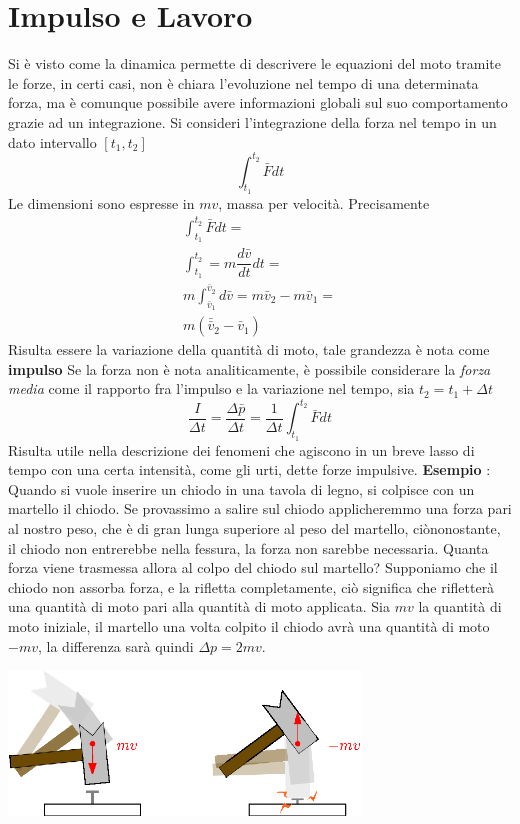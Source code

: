 \documentclass[10pt, letterpaper]{report}
\begin{document}
\section{Impulso e Lavoro}
Si è visto come la dinamica permette di descrivere le equazioni 
del moto tramite le forze, in certi casi, non è chiara l'evoluzione 
nel tempo di una determinata forza, ma è comunque possibile 
avere informazioni globali sul suo comportamento grazie ad un
 integrazione. Si consideri l'integrazione della forza nel tempo in un dato 
 intervallo $[t_1,t_2]$
 $$ \int_{t_1}^{t_2}\bar F dt$$
 Le dimensioni sono espresse in $mv$, massa per velocità. Precisamente 
\begin{eqnarray}
    \int_{t_1}^{t_2}\bar Fdt =\\ 
    \int_{t_1}^{t_2} = m\dfrac{d\bar v}{dt}dt =\\ 
    m\int_{ \bar v_1}^{ \bar v_2}d\bar v = m\bar v_2-m\bar v_1=\\
    m(\bar \bar v_2-\bar v_1)
\end{eqnarray}
Risulta essere la variazione della quantità di moto, tale grandezza 
è nota come \textbf{impulso}
Se la forza non è nota analiticamente, è possibile 
considerare la \textit{forza media} come il rapporto fra l'impulso 
e la variazione nel tempo, sia $t_2=t_1+\Delta t$
$$ \frac{I}{\Delta t}=\frac{\Delta \bar p}{\Delta t}
=\frac{1}{\Delta t}\int_{t_1}^{t_2}\bar F dt$$
Risulta utile nella descrizione dei fenomeni che agiscono in 
un breve lasso di tempo con una certa intensità, come gli urti, dette 
forze impulsive.\acc 
\textbf{Esempio} : Quando si vuole inserire un chiodo in una tavola di legno, si colpisce 
con un martello il chiodo. Se provassimo a salire sul chiodo applicheremmo una forza pari al nostro peso, che è 
di gran lunga superiore al peso del martello, ciònonostante, il chiodo non entrerebbe nella fessura, la forza non sarebbe 
necessaria.\acc 
Quanta forza viene trasmessa allora al colpo del chiodo sul martello? Supponiamo che il chiodo non assorba 
forza, e la rifletta completamente, ciò significa che rifletterà una quantità di moto pari alla quantità 
di moto applicata. Sia $mv$ la quantità di moto iniziale, il martello una volta colpito il chiodo avrà una 
quantità di moto $-mv$, la differenza sarà quindi $\Delta p=2mv$.\begin{center}
    \includegraphics[width=0.7\textwidth]{images/chiodo.eps} 
\end{center}
\end{document}
